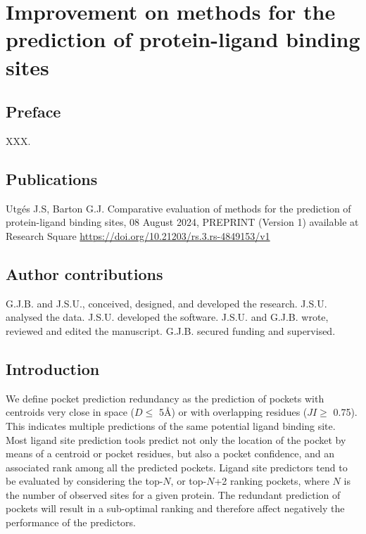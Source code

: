 \chapter{Improvement on methods for the prediction of protein-ligand binding sites}

\section*{Preface}

XXX.

\section*{Publications}

Utgés J.S, Barton G.J. Comparative evaluation of methods for the prediction of protein-ligand binding sites, 08 August 2024, PREPRINT (Version 1) available at Research Square \url{https://doi.org/10.21203/rs.3.rs-4849153/v1} \cite{UTGES_2024_LBSCOMP}

\section*{Author contributions}

G.J.B. and J.S.U., conceived, designed, and developed the research. J.S.U. analysed the data. J.S.U. developed the software. J.S.U. and G.J.B. wrote, reviewed and edited the manuscript. G.J.B. secured funding and supervised.

\section{Introduction}


We define pocket prediction redundancy as the prediction of pockets with centroids very close in space ($D \leq$ 5\AA{}) or with overlapping residues ($JI \geq$ 0.75). This indicates multiple predictions of the same potential ligand binding site. Most ligand site prediction tools predict not only the location of the pocket by means of a centroid or pocket residues, but also a pocket confidence, and an associated rank among all the predicted pockets. Ligand site predictors tend to be evaluated by considering the top-$N$, or top-$N$+2 ranking pockets, where $N$ is the number of observed sites for a given protein. The redundant prediction of pockets will result in a sub-optimal ranking and therefore affect negatively the performance of the predictors.

